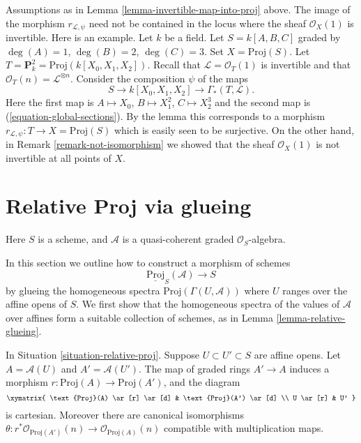 \begin{remark}
\label{remark-not-in-invertible-locus}
Assumptions as in Lemma \ref{lemma-invertible-map-into-proj} above.
The image of the morphism $r_{\mathcal{L}, \psi}$ need not be
contained in the locus where the sheaf $\mathcal{O}_X(1)$
is invertible.
Here is an example.
Let $k$ be a field.
Let $S = k[A, B, C]$ graded by $\deg(A) = 1$, $\deg(B) = 2$, $\deg(C) = 3$.
Set $X = \text{Proj}(S)$.
Let $T = \mathbf{P}^2_k = \text{Proj}(k[X_0, X_1, X_2])$.
Recall that $\mathcal{L} = \mathcal{O}_T(1)$ is invertible
and that $\mathcal{O}_T(n) = \mathcal{L}^{\otimes n}$.
Consider the composition $\psi$ of the maps
$$
S \to k[X_0, X_1, X_2] \to \Gamma_*(T, \mathcal{L}).
$$
Here the first map is $A \mapsto X_0$, $B \mapsto X_1^2$,
$C \mapsto X_2^3$ and the second map is (\ref{equation-global-sections}).
By the lemma this corresponds to a morphism
$r_{\mathcal{L}, \psi} : T \to X = \text{Proj}(S)$
which is easily seen to be surjective. On the other hand, in
Remark \ref{remark-not-isomorphism} we showed that the sheaf
$\mathcal{O}_X(1)$ is not invertible at all points of $X$.
\end{remark}










\section{Relative Proj via glueing}
\label{section-relative-proj-via-glueing}

\begin{situation}
\label{situation-relative-proj}
Here $S$ is a scheme, and $\mathcal{A}$
is a quasi-coherent graded $\mathcal{O}_S$-algebra.
\end{situation}

\noindent
In this section we outline how to construct a morphism
of schemes
$$
\underline{\text{Proj}}_S(\mathcal{A}) \longrightarrow S
$$
by glueing the homogeneous spectra $\text{Proj}(\Gamma(U, \mathcal{A}))$
where $U$ ranges over the affine opens of $S$. We first show that the
homogeneous spectra of the values of $\mathcal{A}$ over affines form a
suitable collection of schemes, as in Lemma \ref{lemma-relative-glueing}.

\begin{lemma}
\label{lemma-proj-inclusion}
In Situation \ref{situation-relative-proj}.
Suppose $U \subset U' \subset S$ are affine opens.
Let $A = \mathcal{A}(U)$ and $A' = \mathcal{A}(U')$.
The map of graded rings $A' \to A$ induces a morphism
$r : \text{Proj}(A) \to \text{Proj}(A')$, and the diagram
$$
\xymatrix{
\text{Proj}(A) \ar[r] \ar[d] &
\text{Proj}(A') \ar[d] \\
U \ar[r] &
U'
}
$$
is cartesian. Moreover there are canonical isomorphisms
$\theta : r^*\mathcal{O}_{\text{Proj}(A')}(n) \to
\mathcal{O}_{\text{Proj}(A)}(n)$ compatible with multiplication maps.
\end{lemma}

